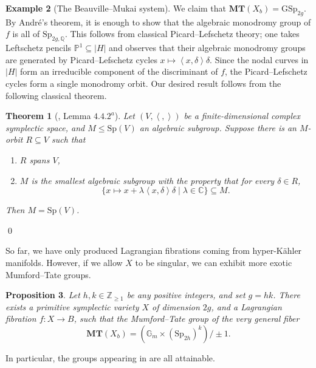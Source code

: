 \documentclass[12pt]{amsart}
\newcommand{\Q}{\mathbb{Q}}
\newcommand{\C}{\mathbb{C}}
\newcommand{\Z}{\mathbb{Z}}
\newcommand{\Sp}{\mathrm{Sp}}
\newtheorem{theorem}{Theorem}[section]
\newtheorem{proposition}[theorem]{Proposition}
\theoremstyle{definition}
\newtheorem{example}[theorem]{Example}
\numberwithin{equation}{section}
\begin{document}
\begin{example}[The Beauville--Mukai system]
We claim that \(\mathbf{MT}(X_b) = \mathrm{GSp}_{2g}\). By Andr\'e's theorem, 
it is enough to show that the algebraic monodromy group of \(f\) is all of
\(\Sp_{2g, \Q}\). This follows from classical Picard--Lefschetz theory; one takes 
Leftschetz pencils \(\mathbb{P}^1 \subseteq |H|\) and observes that their algebraic 
monodromy groups are generated by Picard--Lefschetz cycles 
\(x \mapsto \left<x, \delta\right> \delta\). Since the nodal curves in \(|H|\) form 
an irreducible component of the discriminant of \(f\), the Picard--Lefschetz cycles 
form a single monodromy orbit. Our desired result follows from the following 
classical theorem.

\begin{theorem}[\cite{deligne80}, Lemma \(4.4.2^a\)]
    Let \((V, \left<,\right>)\) be a finite-dimensional complex symplectic space, 
    and \(M \leq \Sp(V)\) an algebraic subgroup. Suppose there is an \(M\)-orbit 
    \(R \subseteq V\) such that 
    \begin{enumerate}
        \item \(R\) spans \(V\),
        \item \(M\) is the smallest algebraic subgroup with the property that 
        for every \(\delta \in R\),
        \[\{x \mapsto x + \lambda\left<x, \delta\right>\delta \mid \lambda \in \C\} \subseteq M.\]
    \end{enumerate}
    Then \(M = \Sp(V)\).
\end{theorem}
\qed
\end{example}


So far, we have only produced Lagrangian fibrations coming from hyper-K\"ahler manifolds. 
However, if we allow \(X\) to be singular, we can exhibit more exotic Mumford--Tate groups.

\begin{proposition} \label{attainability}
    Let \(h, k \in \Z_{\geq 1}\) be any positive integers, and set \(g = hk\).
    There exists a primitive symplectic variety \(X\) of dimension \(2g\), 
    and a Lagrangian fibration \(f: X \to B\), such that the Mumford--Tate group 
    of the very general fiber 
    \[\mathbf{MT}(X_b) = (\mathbb{G}_m \times (\mathrm{Sp}_{2h})^k) / \pm 1. \]
\end{proposition}

In particular, the groups appearing in  are all attainable.
\end{document}
